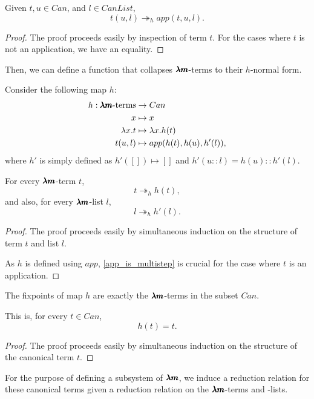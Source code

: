 \begin{lemma}
  \label{app_is_multistep}
  Given $t, u \in Can$, and $l \in CanList$, 
  \[ t(u, l) \twoheadrightarrow_h app(t, u, l). \]
\end{lemma}
\begin{proof}
  The proof proceeds easily by inspection of term $t$.
  For the cases where $t$ is not an application, we have an equality.
\end{proof}

Then, we can define a function that collapses $\pmb{\lambda m}$-terms to their $h$-normal form.

\begin{definition}
  Consider the following map $h$:
  \begin{align*}
    h : \pmb{\lambda m} \text{-terms} &\to Can \\
    x &\mapsto x \\
    \lambda x . t &\mapsto \lambda x . h(t) \\
    t(u,l) &\mapsto app(h(t), h(u), h'(l)),
  \end{align*}
  where $h'$ is simply defined as
  $h'([]) \mapsto []$ and $h'(u::l) = h(u)::h'(l)$.
\end{definition}

\begin{theorem}
  \label{h_is_multistep}
  For every $\pmb{\lambda m}$-term $t$,
  \[ t \twoheadrightarrow_h h(t), \]
  and also, for every $\pmb{\lambda m}$-list $l$,
  \[ l \twoheadrightarrow_h h'(l). \]
\end{theorem}
\begin{proof}
  The proof proceeds easily by simultaneous induction on the structure of term $t$ and list $l$.

  As $h$ is defined using $app$, \cref{app_is_multistep} is crucial for the case where $t$ is an application. 
\end{proof}

\begin{theorem}[$h$ fixpoints]
  \label{h_fixpoints}
  The fixpoints of map $h$ are exactly the $\pmb{\lambda m}$-terms in the subset $Can$.

  This is, for every $t \in Can$, \[ h(t) = t. \]
\end{theorem}
\begin{proof}
  The proof proceeds easily by simultaneous induction on the structure of the canonical term $t$.
\end{proof}

For the purpose of defining a subsystem of $\pmb{\lambda m}$, we induce a reduction relation for these canonical terms given a reduction relation on the $\pmb{\lambda m}$-terms and -lists.

